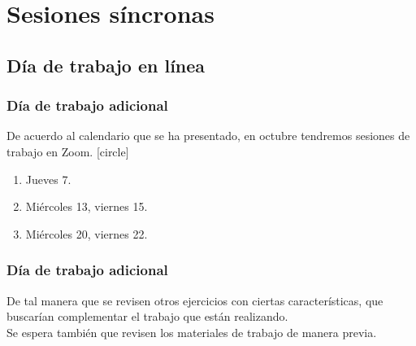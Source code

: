 \documentclass[12pt]{beamer}
\begin{document}

\section{Sesiones síncronas}
\subsection{Día de trabajo en línea}

\begin{frame}
\frametitle{Día de trabajo adicional}
De acuerdo al calendario que se ha presentado, en octubre tendremos sesiones de trabajo en Zoom.
\pause
{}
[circle]
\begin{enumerate}[<+->]
\item Jueves 7.
\item Miércoles 13, viernes 15. 
\item Miércoles 20, viernes 22.
\end{enumerate}
\end{frame}
\begin{frame}
\frametitle{Día de trabajo adicional}
De tal manera que se revisen otros ejercicios con ciertas características, que buscarían complementar el trabajo que están realizando.
\\
\bigskip
Se espera también que revisen los materiales de trabajo de manera previa.
\end{frame}
\end{document}
